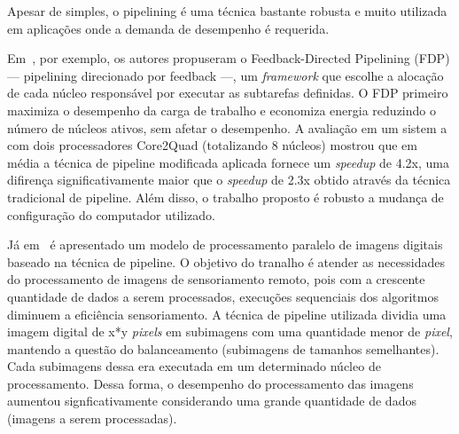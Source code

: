 Apesar de simples, o pipelining é uma técnica bastante robusta e muito utilizada
em aplicações onde a demanda de desempenho é requerida.

Em~\cite{Suleman10}, por exemplo, os autores propuseram o Feedback-Directed
Pipelining (FDP) --- pipelining direcionado por feedback ---, um
\textit{framework} que escolhe a alocação de cada núcleo responsável por
executar as subtarefas definidas. O FDP primeiro maximiza o desempenho da carga
de trabalho e economiza energia reduzindo o número de núcleos ativos, sem afetar
o desempenho. A avaliação em um sistem a com dois processadores Core2Quad
(totalizando 8 núcleos) mostrou que em média a técnica de pipeline modificada
aplicada fornece um \textit{speedup} de 4.2x, uma difirença significativamente
maior que o \textit{speedup} de 2.3x obtido através da técnica tradicional de
pipeline. Além disso, o trabalho proposto é robusto a mudança de configuração do
computador utilizado.

Já em~\cite{Xiao10} é apresentado um modelo de processamento paralelo de imagens
digitais baseado na técnica de pipeline. O objetivo do tranalho é atender as
necessidades do processamento de imagens de sensoriamento remoto, pois com a
crescente quantidade de dados a serem processados, execuções sequenciais dos
algoritmos diminuem a eficiência sensoriamento. A técnica de pipeline utilizada
dividia uma imagem digital de x*y \textit{pixels} em subimagens com uma
quantidade menor de \textit{pixel}, mantendo a questão do balanceamento
(subimagens de tamanhos semelhantes). Cada subimagens dessa era executada em um
determinado núcleo de processamento. Dessa forma, o desempenho do processamento
das imagens aumentou signficativamente considerando uma grande quantidade de
dados (imagens a serem processadas).
